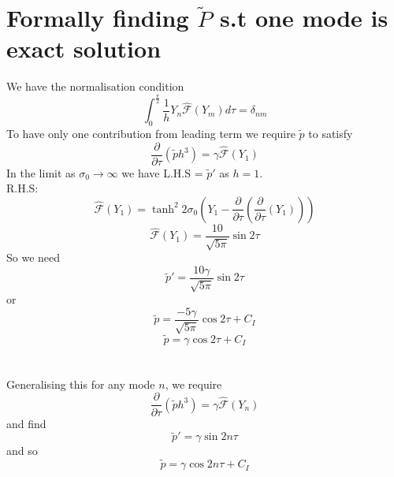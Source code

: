 \documentclass[12pt]{article}
\begin{document}
\section{Formally finding $\tilde{P}$ s.t one mode is exact solution}
We have the normalisation condition $$\int_0^{\frac{\pi}{2}}\frac{1}{h}Y_n\hat{\mathscr{F}}(Y_m)d\tau=\delta_{nm}$$
To have only one contribution from leading term we require $\tilde{p}$ to satisfy $$\frac{\partial}{\partial \tau}(\tilde{p}h^3)=\gamma\hat{\mathscr{F}}(Y_1)$$
In the limit as $\sigma_0 \rightarrow \infty$ we have L.H.S = $\tilde{p}'$ as $h=1$.
\\ R.H.S: $$\hat{\mathscr{F}}(Y_1)=\tanh^2 2\sigma_0 (Y_1-\frac{\partial}{\partial \tau}(\frac{\partial}{\partial \tau}(Y_1)))$$
$$\hat{\mathscr{F}}(Y_1)=\frac{10}{\sqrt{5\pi}}\sin2\tau$$
So we need $$\tilde{p}'=\frac{10\gamma}{\sqrt{5\pi}}\sin2\tau$$ or $$\tilde{p}=\frac{-5\gamma}{\sqrt{5\pi}}\cos2\tau + C_I$$
$$\tilde{p}=\gamma\cos2\tau + C_I$$
\\
\\ Generalising this for any mode $n$, we require $$\frac{\partial}{\partial \tau}(\tilde{p}h^3)=\gamma\hat{\mathscr{F}}(Y_n)$$
and find $$\tilde{p}'=\gamma\sin 2n\tau$$ and so $$\tilde{p}=\gamma\cos 2n\tau + C_I$$
\end{document}
